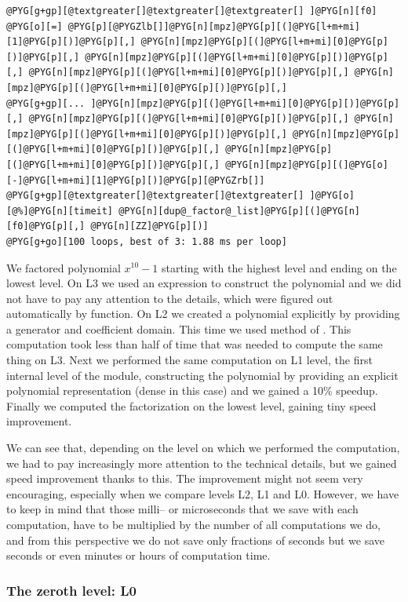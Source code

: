 \begin{Verbatim}[commandchars=@\[\]]
@PYG[g+gp][@textgreater[]@textgreater[]@textgreater[] ]@PYG[n][f0] @PYG[o][=] @PYG[p][@PYGZlb[]]@PYG[n][mpz]@PYG[p][(]@PYG[l+m+mi][1]@PYG[p][)]@PYG[p][,] @PYG[n][mpz]@PYG[p][(]@PYG[l+m+mi][0]@PYG[p][)]@PYG[p][,] @PYG[n][mpz]@PYG[p][(]@PYG[l+m+mi][0]@PYG[p][)]@PYG[p][,] @PYG[n][mpz]@PYG[p][(]@PYG[l+m+mi][0]@PYG[p][)]@PYG[p][,] @PYG[n][mpz]@PYG[p][(]@PYG[l+m+mi][0]@PYG[p][)]@PYG[p][,]
@PYG[g+gp][... ]@PYG[n][mpz]@PYG[p][(]@PYG[l+m+mi][0]@PYG[p][)]@PYG[p][,] @PYG[n][mpz]@PYG[p][(]@PYG[l+m+mi][0]@PYG[p][)]@PYG[p][,] @PYG[n][mpz]@PYG[p][(]@PYG[l+m+mi][0]@PYG[p][)]@PYG[p][,] @PYG[n][mpz]@PYG[p][(]@PYG[l+m+mi][0]@PYG[p][)]@PYG[p][,] @PYG[n][mpz]@PYG[p][(]@PYG[l+m+mi][0]@PYG[p][)]@PYG[p][,] @PYG[n][mpz]@PYG[p][(]@PYG[o][-]@PYG[l+m+mi][1]@PYG[p][)]@PYG[p][@PYGZrb[]]
@PYG[g+gp][@textgreater[]@textgreater[]@textgreater[] ]@PYG[o][@%]@PYG[n][timeit] @PYG[n][dup@_factor@_list]@PYG[p][(]@PYG[n][f0]@PYG[p][,] @PYG[n][ZZ]@PYG[p][)]
@PYG[g+go][100 loops, best of 3: 1.88 ms per loop]
\end{Verbatim}
\noindent
We factored polynomial $x^{10} - 1$ starting with the highest level and ending on the lowest
level. On L3 we used an expression to construct the polynomial and we did not have to pay any
attention to the details, which were figured out automatically by  function.
On L2 we created a polynomial explicitly by providing a generator and coefficient domain. This
time we used  method of . This computation took less than half
of time that was needed to compute the same thing on L3. Next we performed the same computation
on L1 level, the first internal level of the module, constructing the polynomial by providing
an explicit polynomial representation (dense in this case) and we gained a 10\% speedup. Finally
we computed the factorization on the lowest level, gaining tiny speed improvement.

We can see that, depending on the level on which we performed the computation, we had to pay
increasingly more attention to the technical details, but we gained speed improvement thanks
to this. The improvement might not seem very encouraging, especially when we compare levels
L2, L1 and L0. However, we have to keep in mind that those milli-- or microseconds that we
save with each computation, have to be multiplied by the number of all computations we do,
and from this perspective we do not save only fractions of seconds but we save seconds or
even minutes or hours of computation time.


\subsubsection{The zeroth level: L0}

